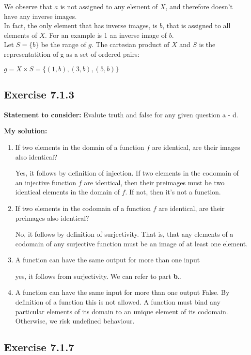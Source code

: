 \documentclass{article}
\newcommand{\cent}[1]{\begin{center}#1\end{center}}
\newcommand{\Remark}{\textbf{Statement to consider: }}
\newcommand{\Solution}{\textbf{My solution: }}
\newcommand{\QED}{\boxed{}}
\newcommand{\Exercise}[1]{\subsection*{Exercise #1}}
\begin{document}
 	We observe that $a$ is not assigned to any element of $X$, and therefore doesn't have any inverse images.\\
 	
 	In fact, the only element that has inverse images, is $b$, that is assigned to all elements of $X$. For an example is 1 an inverse image of $b$. \\
 	
 	Let $S = \{b\}$ be the range of $g$. The cartesian product of $X$ and $S$ is the representatition of g as a set of ordered pairs:
 	
 	\cent{$g = X \times S = \{(1,b),(3,b),(5,b)\}$}
 	
 	\QED
 	
 	\Exercise{7.1.3}
 	\Remark
 	Evalute truth and false for any given question a - d.
 	
 	\Solution
 	
 	\begin{enumerate}[label=\textbf{\alph*.}]
 		\item If two elements in the domain of a function $f$ are identical, are their images also identical?
 		
 		Yes, it follows by definition of injection. If two elements in the codomain of an injective  function $f$ are identical, then their preimages must be two identical elements in the domain of $f$. If not, then it's not a function.
 		
 		\item If two elements in the codomain of a function $f$ are identical, are their preimages also identical?
 		
 		No, it follows by definition of surjectivity. That is, that any elements of a codomain of any surjective function must be an image of at least one element. 
 		
 		\item A function can have the same output for more than one input
 		
 		yes, it follows from surjectivity. We can refer to part \textbf{b.}.
 		
 		\item A function can have the same input for more than one output
 		False. By definition of a function this is not allowed. A function must bind any particular elements of its domain to an unique element of its codomain. Otherwise, we risk undefined behaviour.
 	\end{enumerate}
 
 \Exercise{7.1.7}
 
\end{document}
